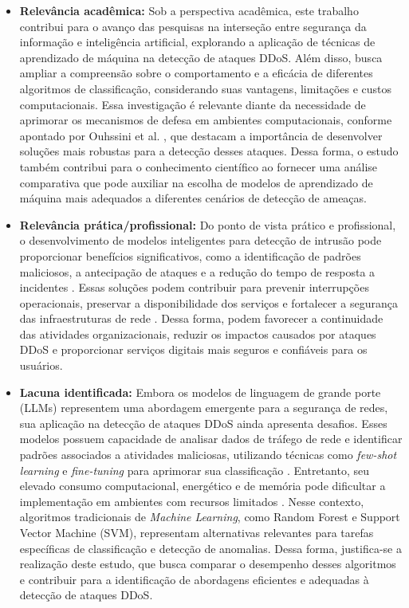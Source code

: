 \documentclass[
    12pt,                %
    openright,           %
    oneside,             %
    a4paper,             %
    english,             %
    brazil               %
]{abntex2}
\begin{document}
\begin{itemize}
    \item \textbf{Relevância acadêmica:} Sob a perspectiva acadêmica, este trabalho contribui para o avanço das pesquisas na interseção entre segurança da informação e inteligência artificial, explorando a aplicação de técnicas de aprendizado de máquina na detecção de ataques DDoS. Além disso, busca ampliar a compreensão sobre o comportamento e a eficácia de diferentes algoritmos de classificação, considerando suas vantagens, limitações e custos computacionais. Essa investigação é relevante diante da necessidade de aprimorar os mecanismos de defesa em ambientes computacionais, conforme apontado por Ouhssini et al. \cite{ouhssini2024}, que destacam a importância de desenvolver soluções mais robustas para a detecção desses ataques. Dessa forma, o estudo também contribui para o conhecimento científico ao fornecer uma análise comparativa que pode auxiliar na escolha de modelos de aprendizado de máquina mais adequados a diferentes cenários de detecção de ameaças.

    \item \textbf{Relevância prática/profissional:} Do ponto de vista prático e profissional, o desenvolvimento de modelos inteligentes para detecção de intrusão pode proporcionar benefícios significativos, como a identificação de padrões maliciosos, a antecipação de ataques e a redução do tempo de resposta a incidentes \cite{thaqi2026}. Essas soluções podem contribuir para prevenir interrupções operacionais, preservar a disponibilidade dos serviços e fortalecer a segurança das infraestruturas de rede \cite{ouhssini2024}. Dessa forma, podem favorecer a continuidade das atividades organizacionais, reduzir os impactos causados por ataques DDoS e proporcionar serviços digitais mais seguros e confiáveis para os usuários.

    \item \textbf{Lacuna identificada:} Embora os modelos de linguagem de grande porte (LLMs) representem uma abordagem emergente para a segurança de redes, sua aplicação na detecção de ataques DDoS ainda apresenta desafios. Esses modelos possuem capacidade de analisar dados de tráfego de rede e identificar padrões associados a atividades maliciosas, utilizando técnicas como \textit{few-shot learning} e \textit{fine-tuning} para aprimorar sua classificação \cite{guastalla2024}. Entretanto, seu elevado consumo computacional, energético e de memória pode dificultar a implementação em ambientes com recursos limitados \cite{argerich2024}. Nesse contexto, algoritmos tradicionais de \textit{Machine Learning}, como Random Forest e Support Vector Machine (SVM), representam alternativas relevantes para tarefas específicas de classificação e detecção de anomalias. Dessa forma, justifica-se a realização deste estudo, que busca comparar o desempenho desses algoritmos e contribuir para a identificação de abordagens eficientes e adequadas à detecção de ataques DDoS.
\end{itemize}
\end{document}

